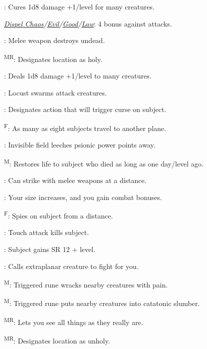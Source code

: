 : Cures 1d8 damage +1/level for many creatures.

\noindent\textit{\hyperref[spell:Dispel Chaos]{Dispel Chaos}/\hyperref[spell:Dispel Evil]{Evil}/\hyperref[spell:Dispel Good]{Good}/\hyperref[spell:Dispel Law]{Law}}: 4 bonus against attacks.

: Melee weapon destroys undead.


\textsuperscript{MR}: Designates location as holy.

: Deals 1d8 damage +1/level to many creatures.

: Locust swarms attack creatures.

: Designates action that will trigger curse on subject.

\textsuperscript{F}: As many as eight subjects travel to another plane.

: Invisible field leeches psionic power points away.

\textsuperscript{M}: Restores life to subject who died as long as one day/level ago.

: Can strike with melee weapons at a distance. %

: Your size increases, and you gain combat bonuses.

\textsuperscript{F}: Spies on subject from a distance.

: Touch attack kills subject.

: Subject gains SR 12 + level.

: Calls extraplanar creature to fight for you.

\textsuperscript{M}: Triggered rune wracks nearby creatures with pain.

\textsuperscript{M}: Triggered rune puts nearby creatures into catatonic slumber.

\textsuperscript{MR}: Lets you see all things as they really are.

\textsuperscript{MR}: Designates location as unholy.

